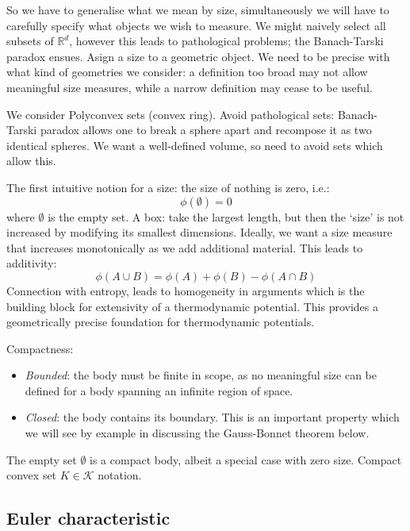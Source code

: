 So we have to generalise what we mean by size, simultaneously we will have to carefully specify what objects we wish to measure.
We might naively select all subsets of $\mathbb{R}^d$, however this leads to pathological problems; the Banach-Tarski paradox ensues.
Asign a size to a geometric object.
We need to be precise with what kind of geometries we consider: a definition too broad may not allow meaningful size measures, while a narrow definition may cease to be useful.

We consider Polyconvex sets (convex ring).
Avoid pathological sets: Banach-Tarski paradox allows one to break a sphere apart and recompose it as two identical spheres.
We want a well-defined volume, so need to avoid sets which allow this.

The first intuitive notion for a size: the size of nothing is zero, i.e.:
\begin{equation}
  \phi(\emptyset) = 0
\end{equation}
where $\emptyset$ is the empty set.
A box: take the largest length, but then the `size' is not increased by modifying its smallest dimensions.
Ideally, we want a size measure that increases monotonically as we add additional material. This leads to additivity:
\begin{equation}
  \phi(A \cup B) = \phi(A) + \phi(B) - \phi(A \cap B)
\end{equation}
Connection with entropy, leads to homogeneity in arguments which is the building block for extensivity of a thermodynamic potential.
This provides a geometrically precise foundation for thermodynamic potentials.

Compactness:
\begin{itemize}
\item \emph{Bounded}: the body must be finite in scope, as no meaningful size can be defined for a body spanning an infinite region of space.
\item \emph{Closed}: the body contains its boundary.
  This is an important property which we will see by example in discussing the Gauss-Bonnet theorem below.
\end{itemize}
The empty set $\emptyset$ is a compact body, albeit a special case with zero size.
Compact convex set $K \in \mathcal{K}$ notation.

\subsection{Euler characteristic}

